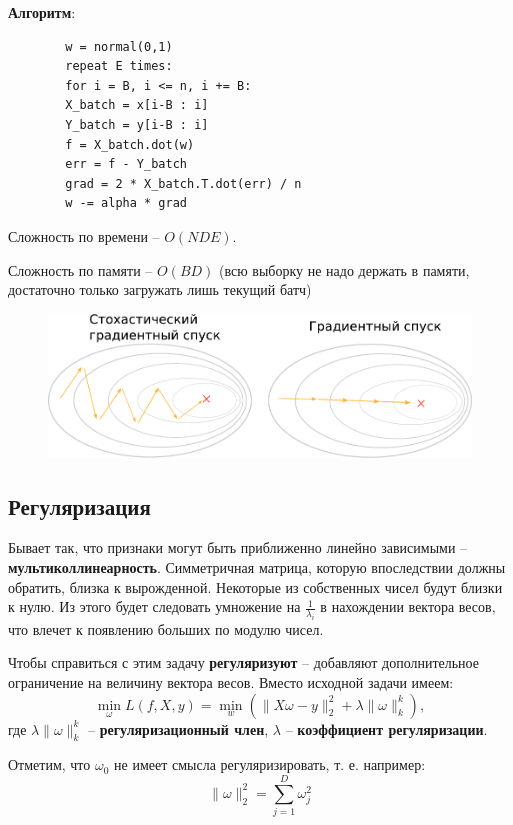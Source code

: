 \documentclass[a4paper, 10pt, openany]{book} %
\begin{document}
	\textbf{Алгоритм}:
	\begin{lstlisting}
		w = normal(0,1)
		repeat E times:
		for i = B, i <= n, i += B:
		X_batch = x[i-B : i]
		Y_batch = y[i-B : i]
		f = X_batch.dot(w)
		err = f - Y_batch
		grad = 2 * X_batch.T.dot(err) / n
		w -= alpha * grad
	\end{lstlisting}
	
	Сложность по времени -- $O(NDE)$.
	
	Сложность по памяти -- $O(BD)$ (всю выборку не надо держать в памяти, достаточно только загружать лишь текущий батч)
	
	\newpage
	
	\begin{figure}[h!]
		\centering
		\includegraphics[width=\linewidth]{pictures/linear_models/SGD_GD.pdf}
	\end{figure}
	
	\subsection{Регуляризация}
	
	Бывает так, что признаки могут быть приближенно линейно зависимыми -- \textbf{мультиколлинеарность}. Симметричная матрица, которую впоследствии должны обратить, близка к вырожденной. Некоторые из собственных чисел будут близки к нулю. Из этого будет следовать умножение на $\frac{1}{\lambda_i}$ в нахождении вектора весов, что влечет к появлению больших по модулю чисел.
	
	Чтобы справиться с этим задачу \textbf{регуляризуют} -- добавляют дополнительное ограничение на величину вектора весов. Вместо исходной задачи имеем:
	\begin{equation*}
		\min_\omega L(f,X,y) = \min_w (\|X\omega-y\|^2_2 + \lambda \|\omega\|^k_k),
	\end{equation*}
	где $\lambda \|\omega\|^k_k$ -- \textbf{регуляризационный член}, $\lambda$ -- \textbf{коэффициент регуляризации}.
	
	Отметим, что $\omega_0$ не имеет смысла регуляризировать, т. е. например:
	\begin{equation*}
		\|\omega\|^2_2 = \sum_{j=1}^{D} \omega_j^2
	\end{equation*}
	
\end{document}
